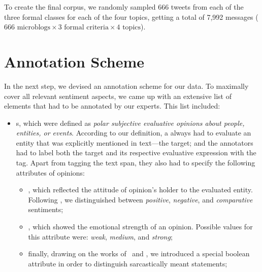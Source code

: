 To create the final corpus, we randomly sampled 666 tweets from each
of the three formal classes for each of the four topics, getting a
total of 7,992 messages ($666\text{ microblogs} \times 3\text{ formal
  criteria} \times 4\text{ topics}$).

\section{Annotation Scheme}\label{subsec:snt:ascheme}

In the next step, we devised an annotation scheme for our data.  To
maximally cover all relevant sentiment aspects, we came up with an
extensive list of elements that had to be annotated by our experts.
This list included:

\begin{itemize}
\item
  \textbf{}s, which were defined as \emph{polar
    subjective evaluative opinions about people, entities, or events}.
  According to our definition, a  always had to
  evaluate an entity that was explicitly mentioned in text---the
  target; and the annotators had to label both the target and its
  respective evaluative expression with the 
  tag. Apart from tagging the text span, they also had to specify the
  following attributes of opinions:
  \begin{itemize}
  \item{}, which reflected the attitude of opinion's
    holder to the evaluated entity.  Following
    \citet{Jindal:06a,Jindal:06b}, we distinguished between
    \emph{positive}, \emph{negative}, and \emph{comparative}
    sentiments;
  \item{}, which showed the emotional strength of
    an opinion.  Possible values for this attribute were: \emph{weak},
    \emph{medium}, and \emph{strong};
  \item finally, drawing on the works of~\citet{Bosco:13} and
    \citet{Rosenthal:14}, we introduced a special boolean attribute
     in order to distinguish sarcastically meant
    statements;
  \end{itemize}



\end{itemize}
